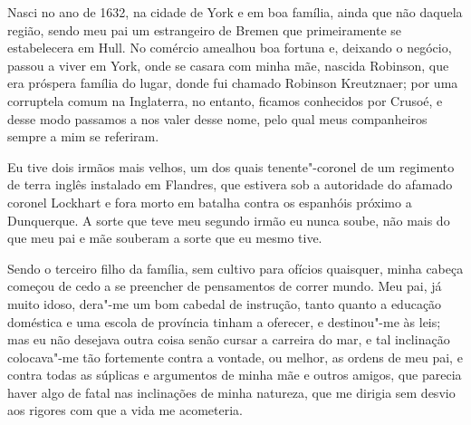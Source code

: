 Nasci no ano de 1632, na cidade de York e em boa família, ainda que não
daquela região, sendo meu pai um estrangeiro de Bremen que primeiramente
se estabelecera em Hull. No comércio amealhou boa fortuna e, deixando o
negócio, passou a viver em York, onde se casara com minha mãe, nascida
Robinson, que era próspera família do lugar, donde fui chamado Robinson
Kreutznaer; por uma corruptela comum na Inglaterra, no entanto, ficamos
conhecidos por Crusoé, e desse modo passamos a nos valer desse nome,
pelo qual meus companheiros sempre a mim se referiram.

Eu tive dois irmãos mais velhos, um dos quais tenente"-coronel de um
regimento de terra inglês instalado em Flandres, que estivera sob a
autoridade do afamado coronel Lockhart e fora morto em batalha contra os
espanhóis próximo a Dunquerque. A sorte que teve meu segundo irmão eu
nunca soube, não mais do que meu pai e mãe souberam a sorte que eu mesmo
tive.

Sendo o terceiro filho da família, sem cultivo para ofícios quaisquer,
minha cabeça começou de cedo a se preencher de pensamentos de correr
mundo. Meu pai, já muito idoso, dera"-me um bom cabedal de instrução,
tanto quanto a educação doméstica e uma escola de província tinham a
oferecer, e destinou"-me às leis; mas eu não desejava outra coisa senão
cursar a carreira do mar, e tal inclinação colocava"-me tão fortemente
contra a vontade, ou melhor, as ordens de meu pai, e contra todas as
súplicas e argumentos de minha mãe e outros amigos, que parecia haver
algo de fatal nas inclinações de minha natureza, que me dirigia sem
desvio aos rigores com que a vida me acometeria.

